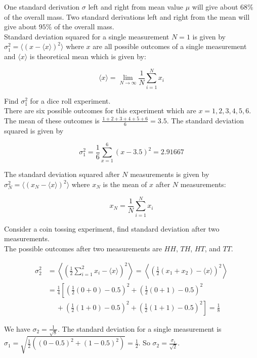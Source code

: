 \documentclass[12pt, a4paper]{article}
\newcounter{exa}
\begin{document}
One standard derivation $\sigma$ left and right from mean value $\mu$ will give about $68\%$ of the overall mass. Two standard derivations left and right from the mean will give about $95\%$ of the overall mass. \\

Standard deviation squared for a single measurement $N=1$ is given by $\sigma_1^2 = \langle (x - \langle x \rangle)^2 \rangle$ where $x$ are all possible outcomes of a single measurement and $\langle x \rangle$ is theoretical mean which is given by:

$$\langle x \rangle= \lim_{N\to\infty}\frac{1}{N}\sum_{i=1}^N x_i$$

\begin{texample}
Find $\sigma_1^2$ for a dice roll experiment. \\

There are six possible outcomes for this experiment which are $x=1, 2, 3, 4, 5, 6$. The mean of these outcomes is $\frac{1+2+3+4+5+6}{6}=3.5$. The standard deviation squared is given by

$$\sigma_1^2 = \frac{1}{6} \sum_{x=1}^6 \left( x - 3.5 \right)^2 = 2.91667$$
\end{texample}

The standard deviation squared after $N$ measurements is given by $\sigma_N^2 = \langle (x_N - \langle x \rangle)^2 \rangle$ where $x_N$ is the mean of $x$ after $N$ measurements:

$$x_N = \frac{1}{N}\sum_{i=1}^N x_i$$

\begin{texample}
Consider a coin tossing experiment, find standard deviation after two measurements. \\

The possible outcomes after two measurements are $HH$, $TH$, $HT$, and $TT$.

\begin{align*}
\sigma_2^2 &= \left\langle \left( \frac12 \sum_{i=1}^2 x_i - \langle x \rangle \right)^2 \right\rangle  = \left\langle  \left(\frac12 \left(x_1 + x_2 \right)  - \langle x \rangle \right)^2\right\rangle \\
&= \frac14 \left[ \left(\frac12(0+0)-0.5\right)^2 + \left(\frac12(0+1)-0.5\right)^2 \right. \\
&\phantom{-} + \left. \left(\frac12(1+0)-0.5\right)^2 +\left(\frac12(1+1)-0.5\right)^2 \right] = \frac18
\end{align*}

We have $\sigma_2 = \frac{1}{\sqrt{8}}$. The standard deviation for a single measurement is $\sigma_1=\sqrt{\frac12 \left( (0-0.5)^2+(1-0.5)^2 \right)}=\frac{1}{2}$. So $\sigma_2 = \frac{\sigma_1}{\sqrt{2}}$.
\end{texample}
\end{document}
